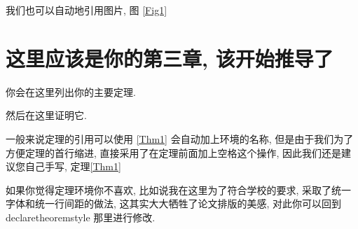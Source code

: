 \documentclass[12pt,a4paper,UTF8]{ctexart}
\makeatletter
\renewcommand{\heiti}{\myheiti}
\renewcommand{\fangsong}{\myfangsong}
\newcommand{\refstyle}{\fangsong\small\onehalfspacing\setlength{\parindent}{0em}\setlength{\hangindent}{0.74cm}}
\renewenvironment{proof}[1][\proofname]{%
  \par
  \pushQED{\qed}%
  \topsep6\p@\@plus6\p@\relax  %
  \trivlist
  \item[\hskip\labelsep\hspace{2em}\bfseries\heiti #1]\ignorespaces  %
}{%
  \popQED\endtrivlist\@endpefalse
}
\makeatother
\begin{document}
我们也可以自动地引用图片, 图 \ref{Fig1}

\section{这里应该是你的第三章, 该开始推导了}

\begin{theorem}
  \label{Thm1} %
  你会在这里列出你的主要定理. 
\end{theorem}

\begin{proof}
  然后在这里证明它. 
\end{proof}

一般来说定理的引用可以使用 \autoref{Thm1} 会自动加上环境的名称, 
但是由于我们为了方便定理的首行缩进, 直接采用了在定理前面加上空格这个操作, 
因此我们还是建议您自己手写, 定理\ref{Thm1}

如果你觉得定理环境你不喜欢, 比如说我在这里为了符合学校的要求, 
采取了统一字体和统一行间距的做法, 这其实大大牺牲了论文排版的美感, 
对此你可以回到 declaretheoremstyle 那里进行修改. 




\newpage
\refstyle



\newpage
\end{document}
